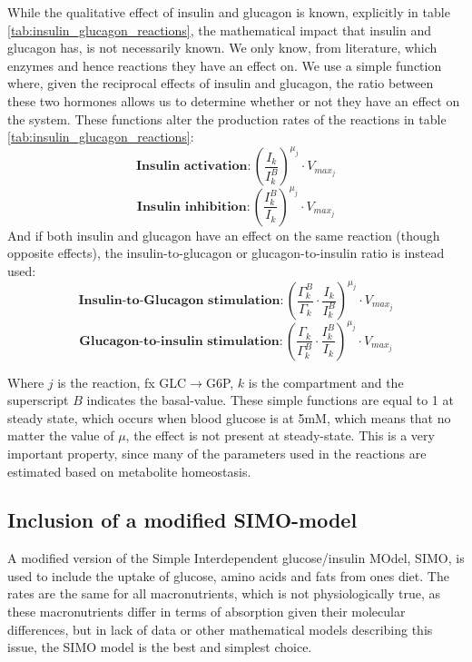 \documentclass{IEEEtran}
\begin{document}
While the qualitative effect of insulin and glucagon is known, explicitly in table \ref{tab:insulin_glucagon_reactions}, the mathematical impact that insulin and glucagon has, is not necessarily known. We only know, from literature, which enzymes and hence reactions they have an effect on. We use a simple function where, given the reciprocal effects of insulin and glucagon, the ratio between these two hormones allows us to determine whether or not they have an effect on the system. These functions alter the production rates of the reactions in table \ref{tab:insulin_glucagon_reactions}:
\begin{equation}
    \textbf{Insulin activation}: \left(\frac{I_k}{I_k^B}\right)^{\mu_j}\cdot V_{max_j}
\end{equation}
\begin{equation}
    \textbf{Insulin inhibition}: \left(\frac{I_k^B}{I_k}\right)^{\mu_j}\cdot V_{max_j}
\end{equation}
And if both insulin and glucagon have an effect on the same reaction (though opposite effects), the insulin-to-glucagon or glucagon-to-insulin ratio is instead used:
\begin{equation}
    \textbf{Insulin-to-Glucagon stimulation}: \left(\frac{\Gamma_k^B}{\Gamma_k}\cdot \frac{I_k}{I_k^B}\right)^{\mu_j}\cdot V_{max_j}
\end{equation}
\begin{equation}
    \textbf{Glucagon-to-insulin stimulation}: \left(\frac{\Gamma_k}{\Gamma_k^B}\cdot \frac{I_k^B}{I_k}\right)^{\mu_j}\cdot V_{max_j}
\end{equation}

Where $j$ is the reaction, fx GLC$\rightarrow$G6P, $k$ is the compartment and the superscript $B$ indicates the basal-value. These simple functions are equal to 1 at steady state, which occurs when blood glucose is at 5mM, which means that no matter the value of $\mu$, the effect is not present at steady-state. This is a very important property, since many of the parameters used in the reactions are estimated based on metabolite homeostasis. \\




\subsection{Inclusion of a modified SIMO-model}  


A modified version of the Simple Interdependent glucose/insulin MOdel, SIMO, \cite{panunzi_pompa_borri_piemonte_gaetano_2020} is used to include the uptake of glucose, amino acids and fats from ones diet. The rates are the same for all macronutrients, which is not physiologically true, as these macronutrients differ in terms of absorption given their molecular differences, but in lack of data or other mathematical models describing this issue, the SIMO model is the best and simplest choice. \\
\end{document}
